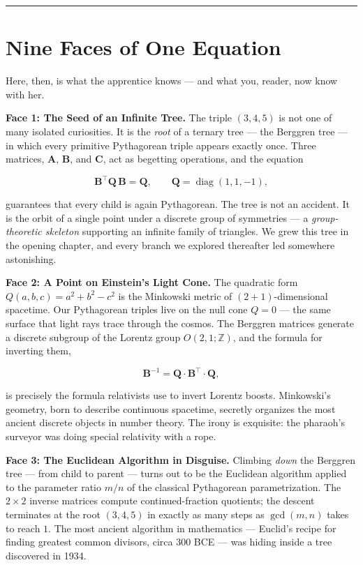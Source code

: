 \documentclass[12pt, letterpaper, openany]{book}
\theoremstyle{definition}
\theoremstyle{remark}
\begin{document}
\bigskip\noindent\rule{\textwidth}{0.4pt}\bigskip



\section*{Nine Faces of One Equation}


Here, then, is what the apprentice knows --- and what you, reader, now know with her.

\textbf{Face 1: The Seed of an Infinite Tree.} The triple $(3, 4, 5)$ is not one of many isolated curiosities. It is the \textit{root} of a ternary tree --- the Berggren tree --- in which every primitive Pythagorean triple appears exactly once. Three matrices, $\mathbf{A}$, $\mathbf{B}$, and $\mathbf{C}$, act as begetting operations, and the equation

\[
\mathbf{B}^{\!\top} \mathbf{Q}\, \mathbf{B} = \mathbf{Q}, \qquad \mathbf{Q} = \operatorname{diag}(1, 1, -1),
\]

guarantees that every child is again Pythagorean. The tree is not an accident. It is the orbit of a single point under a discrete group of symmetries --- a \textit{group-theoretic skeleton} supporting an infinite family of triangles. We grew this tree in the opening chapter, and every branch we explored thereafter led somewhere astonishing.

\textbf{Face 2: A Point on Einstein's Light Cone.} The quadratic form $Q(a, b, c) = a^2 + b^2 - c^2$ is the Minkowski metric of $(2{+}1)$-dimensional spacetime. Our Pythagorean triples live on the null cone $Q = 0$ --- the same surface that light rays trace through the cosmos. The Berggren matrices generate a discrete subgroup of the Lorentz group $O(2,1;\mathbb{Z})$, and the formula for inverting them,

\[
\mathbf{B}^{-1} = \mathbf{Q} \cdot \mathbf{B}^{\!\top} \cdot \mathbf{Q},
\]

is precisely the formula relativists use to invert Lorentz boosts. Minkowski's geometry, born to describe continuous spacetime, secretly organizes the most ancient discrete objects in number theory. The irony is exquisite: the pharaoh's surveyor was doing special relativity with a rope.

\textbf{Face 3: The Euclidean Algorithm in Disguise.} Climbing \textit{down} the Berggren tree --- from child to parent --- turns out to be the Euclidean algorithm applied to the parameter ratio $m/n$ of the classical Pythagorean parametrization. The $2 \times 2$ inverse matrices compute continued-fraction quotients; the descent terminates at the root $(3, 4, 5)$ in exactly as many steps as $\gcd(m, n)$ takes to reach $1$. The most ancient algorithm in mathematics --- Euclid's recipe for finding greatest common divisors, circa 300 BCE --- was hiding inside a tree discovered in 1934.
\end{document}
